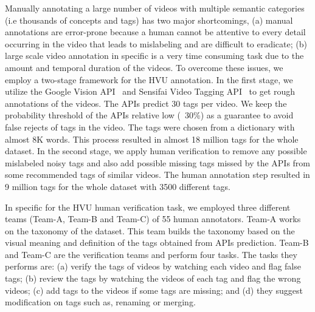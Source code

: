 \documentclass[runningheads]{llncs}
\begin{document}
Manually annotating a large number of videos with multiple semantic categories (i.e thousands of concepts and tags) has two major shortcomings, (a) manual annotations are error-prone because a human cannot be attentive to every detail occurring in the video that leads to mislabeling and are difficult to eradicate; (b) large scale video annotation in specific is a very time consuming task due to the amount and temporal duration of the videos. To overcome these issues, we employ a two-stage framework for the HVU annotation. In the first stage, we utilize the Google Vision API~\cite{googleAI} and Sensifai Video Tagging API~\cite{sensifai} to get rough annotations of the videos. The APIs predict 30 tags per video. We keep the probability threshold of the APIs relative low (~30\%) as a guarantee to avoid false rejects of tags in the video.  The tags were chosen from a dictionary with almost 8K words. This process resulted in almost 18 million tags for the whole dataset. In the second stage, we apply human verification to remove any possible mislabeled noisy tags and also add possible missing tags missed by the APIs from some recommended tags of similar videos. The human annotation step resulted in 9 million tags for the whole dataset with 3500 different tags.

\iffalse
\begin{figure}[t]
    \centering
    \texttt{[image: HVU\_Dataset/tsne.pdf]}
    \vspace{-0.5cm}
    \caption{Different labels tend to co-occur semantically in HVU. Here, we visualize t-SNE~\cite{tsne} relationship  based on label co-occurrence, without using video content.}
    \label{fig:Chart_top30}
    \vspace{-0.6cm}
\end{figure}
\fi

\iffalse
In specific for the HVU human verification task, we employed three different teams (Team-A, Team-B and Team-C) of 55 human annotators. Team-A works on the taxonomy of the dataset. This team builds the taxonomy based on the visual meaning and definition of the tags obtained from APIs prediction. Team-B and Team-C are the verification teams and perform four tasks. The tasks they performs are: (a) verify the tags of videos by watching each video and flag false tags; (b) review the tags by watching the videos of each tag and flag the wrong videos; (c) add tags to the videos if some tags are missing;
and (d) they suggest modification on tags such as, renaming or merging.
\end{document}
